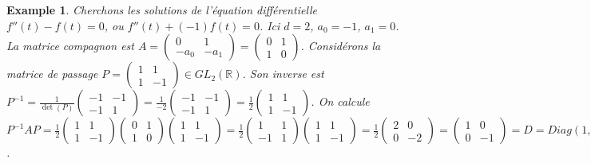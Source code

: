 \documentclass{article}
\newtheorem{example}{Example}
\begin{document}
\begin{example}
Cherchons les solutions de l'équation différentielle $f''(t) - f(t) = 0$, ou $f''(t) + (-1)f(t) = 0$. Ici $d=2$, $a_0 = -1$, $a_1 = 0$. La matrice compagnon est $A = \begin{pmatrix} 0 & 1 \\ -a_0 & -a_1 \end{pmatrix} = \begin{pmatrix} 0 & 1 \\ 1 & 0 \end{pmatrix}$.
Considérons la matrice de passage $P = \begin{pmatrix} 1 & 1 \\ 1 & -1 \end{pmatrix} \in GL_2(\mathbb{R})$. Son inverse est $P^{-1} = \frac{1}{\det(P)} \begin{pmatrix} -1 & -1 \\ -1 & 1 \end{pmatrix} = \frac{1}{-2} \begin{pmatrix} -1 & -1 \\ -1 & 1 \end{pmatrix} = \frac{1}{2} \begin{pmatrix} 1 & 1 \\ 1 & -1 \end{pmatrix}$.
On calcule $P^{-1}AP = \frac{1}{2} \begin{pmatrix} 1 & 1 \\ 1 & -1 \end{pmatrix} \begin{pmatrix} 0 & 1 \\ 1 & 0 \end{pmatrix} \begin{pmatrix} 1 & 1 \\ 1 & -1 \end{pmatrix} = \frac{1}{2} \begin{pmatrix} 1 & 1 \\ -1 & 1 \end{pmatrix} \begin{pmatrix} 1 & 1 \\ 1 & -1 \end{pmatrix} = \frac{1}{2} \begin{pmatrix} 2 & 0 \\ 0 & -2 \end{pmatrix} = \begin{pmatrix} 1 & 0 \\ 0 & -1 \end{pmatrix} = D = Diag(1, -1)$.


\end{example}
\end{document}
